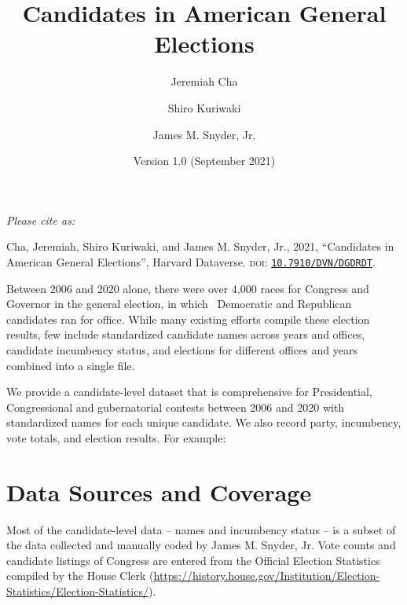 \documentclass[12pt]{article}
\title{\Large\textbf{Candidates in American General Elections}}
\author[1]{\normalsize Jeremiah Cha}
\author[2]{\normalsize Shiro Kuriwaki}
\author[1]{\normalsize James M. Snyder, Jr.}
\affil[1]{\footnotesize Department of Government, Harvard University.}
\affil[2]{\footnotesize Department of Political Science, Stanford University}
\date{\vspace{-0.2in} \normalsize Version 1.0 (September 2021)}
\begin{document}
\maketitle 

\vspace{-0.2in}

\begin{center}
\begin{minipage}{0.75\linewidth}
\small

\emph{Please cite as: }

Cha, Jeremiah, Shiro Kuriwaki, and James M. Snyder, Jr., 2021, ``Candidates in American General Elections'', Harvard Dataverse. \textsc{doi}: \href{https://doi.org/10.7910/DVN/DGDRDT}{\texttt{10.7910/DVN/DGDRDT}}.
\end{minipage}
\end{center}
\smallskip

Between 2006 and 2020 alone, there were over 4,000 races for Congress and Governor in the general election, in which \unskip \ Democratic and Republican candidates ran for office.  
While many existing efforts compile these election results, few include standardized candidate names across years and offices, candidate incumbency status, and elections for different offices and years combined into a single file.

We provide a candidate-level dataset that is comprehensive for Presidential, Congressional and gubernatorial contests between 2006 and 2020 with standardized names for each unique candidate. We also record party, incumbency, vote totals, and election results. For example:

\begin{table}[!h]
\centering
\footnotesize

\end{table}

\newpage

\section{Data Sources and Coverage}

Most of the candidate-level data -- names and incumbency status -- is a subset of the data collected and manually coded by James M. Snyder, Jr. Vote counts and candidate listings of Congress are entered from the Official Election Statistics compiled by the House Clerk (\url{https://history.house.gov/Institution/Election-Statistics/Election-Statistics/}).  
\end{document}
